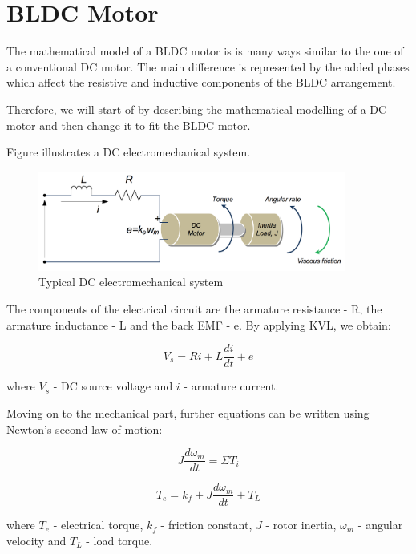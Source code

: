 \section{BLDC Motor}
The mathematical model of a BLDC motor is is many ways similar to the one of a conventional DC motor. The main difference is represented by the added phases which affect the resistive and inductive components of the BLDC arrangement.

Therefore, we will start of by describing the mathematical modelling of a DC motor and then change it to fit the BLDC motor.

Figure \label{electromech} illustrates a DC electromechanical system.

\begin{figure}[H]
  \centering
    \includegraphics[width=0.9\textwidth]{images/electromech.png}
	\caption{Typical DC electromechanical system}
	\label{electromech}
\end{figure}

The components of the electrical circuit are the armature resistance - R, the armature inductance - L and the back EMF - e. By applying KVL, we obtain:

\begin{equation}
\label{1}
	V_{s}=Ri+L\frac{di}{dt}+e
\end{equation}

where $V_{s}$ - DC source voltage and $i$ - armature current.

Moving on to the mechanical part, further equations can be written using Newton's second law of motion:

\begin{equation}
\label{2}
	J\frac{d\omega_{m}}{dt}=\Sigma{T_{i}}
\end{equation}

\begin{equation}
\label{3}
	T_{e}=k_{f}+J\frac{d\omega_{m}}{dt}+T_{L}
\end{equation}

where $T_{e}$ - electrical torque, $k_{f}$ - friction constant, $J$ - rotor inertia, $\omega_{m}$ - angular velocity and $T_{L}$ - load torque.

